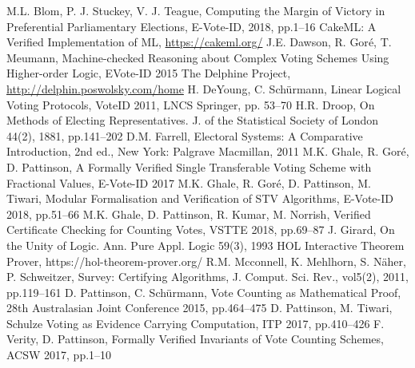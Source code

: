 \documentclass[10pt,conference]{IEEEtran}
\begin{document}

\begin{thebibliography}{00}
M.L. Blom, P. J. Stuckey, V. J. Teague, Computing the Margin of Victory in Preferential Parliamentary Elections, E-Vote-ID, 2018, pp.1--16
CakeML: A Verified Implementation of ML, \url{https://cakeml.org/}
J.E. Dawson, R. Gor{\'{e}}, T. Meumann, Machine-checked Reasoning about
  Complex Voting Schemes Using Higher-order Logic, EVote-ID 2015
The Delphine Project, \url{http://delphin.poswolsky.com/home}
H. DeYoung, C. Sch{\"{u}}rmann, Linear Logical Voting Protocols, VoteID 2011, LNCS Springer, pp. 53--70
H.R. Droop, On Methods of Electing Representatives. J. of the Statistical
  Society of London  44(2), 1881, pp.141--202
D.M. Farrell, Electoral Systems: A Comparative Introduction, 2nd ed., New York: Palgrave Macmillan, 2011
M.K. Ghale, R. Gor{\'{e}}, D. Pattinson, A Formally Verified Single Transferable Voting Scheme with Fractional Values, E-Vote-ID 2017
M.K. Ghale, R. Gor{\'{e}}, D. Pattinson, M. Tiwari,
 Modular Formalisation and Verification of STV Algorithms, E-Vote-ID 2018, pp.51--66
M.K. Ghale, D. Pattinson, R. Kumar, M. Norrish, Verified Certificate Checking for Counting Votes, VSTTE 2018, pp.69--87
J. Girard, On the Unity of Logic. Ann. Pure Appl. Logic  59(3), 1993
HOL Interactive Theorem Prover, https://hol-theorem-prover.org/
R.M. Mcconnell, K. Mehlhorn, S. N\"{a}her, P. Schweitzer, Survey: Certifying Algorithms, J. Comput. Sci. Rev., vol5(2), 2011, pp.119--161
D. Pattinson, C. Sch{\"{u}}rmann, Vote Counting as Mathematical Proof, 28th Australasian Joint
  Conference 2015, pp.464--475
D. Pattinson, M. Tiwari, Schulze Voting as Evidence Carrying Computation, ITP 2017, pp.410--426
F. Verity, D. Pattinson, Formally Verified Invariants of Vote Counting Schemes, ACSW 2017, pp.1--10 
\end{thebibliography}
\end{document}
